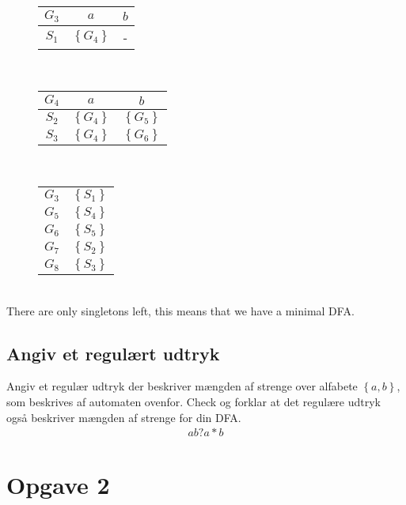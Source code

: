 \documentclass[11pt,a4paper]{article}
\begin{document}
\begin{figure}[!ht]\label{fig:mindfa:g3}
  \centering
  \begin{tabular}{c|cc}
    $G_3$ & $a$ & $b$\\\hline
    $S_1$ & $\left\{G_4\right\}$ & -
  \end{tabular}
\end{figure}\\
\begin{figure}[!ht]\label{fig:mindfa:g4}
  \centering
  \begin{tabular}{c|cc}
    $G_4$ & $a$ & $b$\\\hline
    $S_2$ & $\left\{G_4\right\}$ & $\left\{G_5\right\}$\\
    $S_3$ & $\left\{G_4\right\}$ & $\left\{G_6\right\}$
  \end{tabular}
\end{figure}\\
\begin{figure}[!ht]\label{fig:mindfa:newgs}
  \centering
  \begin{tabular}{c|c}
    $G_3$ & $\left\{S_1\right\}$\\
    $G_5$ & $\left\{S_4\right\}$\\
    $G_6$ & $\left\{S_5\right\}$\\
    $G_7$ & $\left\{S_2\right\}$\\
    $G_8$ & $\left\{S_3\right\}$\\
  \end{tabular}
\end{figure}\\
There are only singletons left, this means that we have a minimal DFA.
\subsection{Angiv et regulært udtryk}
Angiv et regulær udtryk der beskriver mængden af strenge over alfabete $\left\{a, b\right\}$, som beskrives af automaten ovenfor. Check og forklar at det regulære udtryk også beskriver mængden af strenge for din DFA.
\begin{align}
  ab?a*b
\end{align}
\section{Opgave 2}
\end{document}
